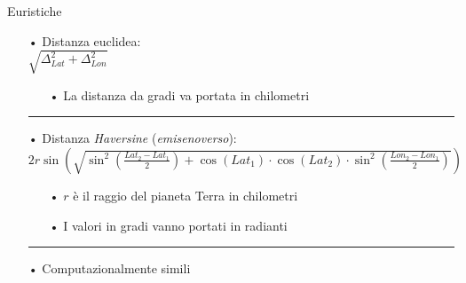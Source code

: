 \documentclass{beamer}
\begin{document}
    \begin{frame}{Euristiche}
        \begin{itemize}
            \item[•] Distanza euclidea: \\
                \vspace{0.2cm}
                $\sqrt{\Delta_{Lat}^2 + \Delta_{Lon}^2}$
                \vspace{0.2cm}
            \begin{itemize}
                \item[•] La distanza da gradi va portata in chilometri
            \end{itemize}

            \vspace{0.2cm}
            \hrule
            \vspace{0.2cm}

            \item[•] Distanza \textit{Haversine} (\textit{emisenoverso}): \\
                    \vspace{0.2cm}
                    $2r \sin (\sqrt{\sin^2(\frac{Lat_2 - Lat_1}{2}) + \cos(Lat_1) \cdot \cos(Lat_2) \cdot \sin^2(\frac{Lon_2 - Lon_1}{2})})$ \\
                    \vspace{0.2cm}
            \begin{itemize}
                \item[•] $r$ è il raggio del pianeta Terra in chilometri
                \item[•] I valori in gradi vanno portati in radianti
            \end{itemize}

            \vspace{0.2cm}
            \hrule
            \vspace{0.2cm}

            \item[•] Computazionalmente simili
        \end{itemize}
   \end{frame}
\end{document}
